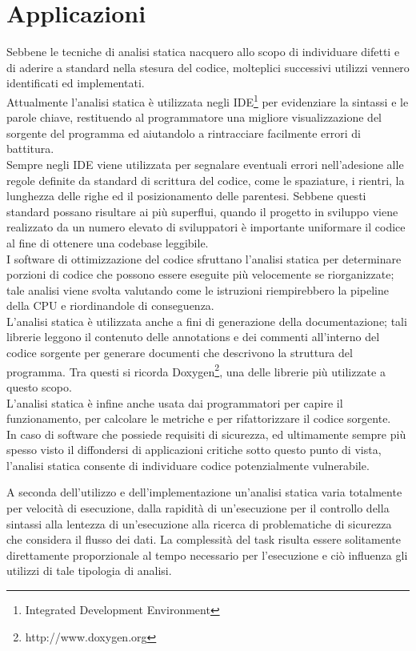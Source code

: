 \section{Applicazioni}
Sebbene le tecniche di analisi statica nacquero allo scopo di individuare difetti e di aderire a standard nella stesura del codice, molteplici successivi utilizzi vennero identificati ed implementati. \\
Attualmente l'analisi statica è utilizzata negli IDE\footnote{Integrated Development Environment} per evidenziare la sintassi e le parole chiave, restituendo al programmatore una migliore visualizzazione del sorgente del programma ed aiutandolo a rintracciare facilmente errori di battitura.\\
Sempre negli IDE viene utilizzata per segnalare eventuali errori nell'adesione alle regole definite da standard di scrittura del codice, come le spaziature, i rientri, la lunghezza delle righe ed il posizionamento delle parentesi. Sebbene questi standard possano risultare ai più superflui, quando il progetto in sviluppo viene realizzato da un numero elevato di sviluppatori è importante uniformare il codice al fine di ottenere una codebase leggibile.\\
I software di ottimizzazione del codice sfruttano l'analisi statica per determinare porzioni di codice che possono essere eseguite più velocemente se riorganizzate; tale analisi viene svolta valutando come le istruzioni riempirebbero la pipeline della CPU e riordinandole di conseguenza.\\
L'analisi statica è utilizzata anche a fini di generazione della documentazione; tali librerie leggono il contenuto delle annotations e dei commenti all'interno del codice sorgente per generare documenti che descrivono la struttura del programma. Tra questi si ricorda Doxygen\footnote{http://www.doxygen.org}, una delle librerie più utilizzate a questo scopo.\\
L'analisi statica è infine anche usata dai programmatori per capire il funzionamento, per calcolare le metriche e per rifattorizzare il codice sorgente.\\
In caso di software che possiede requisiti di sicurezza, ed ultimamente sempre più spesso visto il diffondersi di applicazioni critiche sotto questo punto di vista, l'analisi statica consente di individuare codice potenzialmente vulnerabile.

A seconda dell'utilizzo e dell'implementazione un'analisi statica varia totalmente per velocità di esecuzione, dalla rapidità di un'esecuzione per il controllo della sintassi alla lentezza di un'esecuzione alla ricerca di problematiche di sicurezza che considera il flusso dei dati. La complessità del task risulta essere solitamente direttamente proporzionale al tempo necessario per l'esecuzione e ciò influenza gli utilizzi di tale tipologia di analisi.

